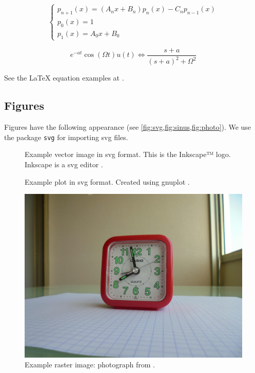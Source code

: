 \begin{equation} \label{eq:example2}
\begin{cases}
p_{n+1}(x) = (A_n x + B_n) p_n(x) - C_n p_{n-1}(x) \\
p_0(x) = 1 \\
p_1(x) = A_0 x + B_0
\end{cases}
\end{equation}

\begin{equation} \label{eq:example3}
e^{ - at} \cos (\Omega t)u(t) \Leftrightarrow
\frac{{s + a}}{{(s + a)^2  + \Omega ^2 }}
\end{equation}

See the LaTeX equation examples at \cite{equationsheet,SO-latex-equations}.

\subsection{Figures}
Figures have the following appearance (see \cref{fig:svg,fig:sinus,fig:photo}).
We use the package \lstinline{svg} \cite{svg} for importing \gls{svg} files.

\begin{figure}

\caption{\label{fig:svg} Example vector image in svg format. This is the
Inkscape™ logo. Inkscape is a \gls{svg} editor \cite{inkscape}.}
\end{figure}

\begin{figure}

\caption{\label{fig:sinus} Example plot in svg format. Created using gnuplot
\cite{gnuplot}.}
\end{figure}

\begin{figure}
\includegraphics[width=\textwidth]{images/photo-alarm-clock.jpg}
\caption{\label{fig:photo} Example raster image: photograph from
\cite{thomashoullier/alarm-clock}.}
\end{figure}

